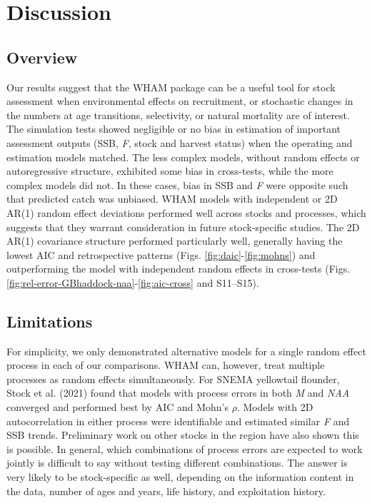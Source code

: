 \documentclass[]{article}
\begin{document}
\hypertarget{discussion}{%
\section{Discussion}\label{discussion}}

\hypertarget{overview}{%
\subsection{Overview}\label{overview}}

Our results suggest that the WHAM package can be a useful tool for stock
assessment when environmental effects on recruitment, or stochastic
changes in the numbers at age transitions, selectivity, or natural
mortality are of interest. The simulation tests showed negligible or no
bias in estimation of important assessment outputs (SSB, \emph{F}, stock
and harvest status) when the operating and estimation models matched.
The less complex models, without random effects or autoregressive
structure, exhibited some bias in cross-tests, while the more complex
models did not. In these cases, bias in SSB and \emph{F} were opposite
such that predicted catch was unbiased. WHAM models with independent or
2D AR(1) random effect deviations performed well across stocks and
processes, which suggests that they warrant consideration in future
stock-specific studies. The 2D AR(1) covariance structure performed
particularly well, generally having the lowest AIC and retrospective
patterns (Figs. \ref{fig:daic}-\ref{fig:mohns}) and outperforming the
model with independent random effects in cross-tests (Figs.
\ref{fig:rel-error-GBhaddock-naa}-\ref{fig:aic-cross} and S11--S15).

\hypertarget{limitations}{%
\subsection{Limitations}\label{limitations}}

For simplicity, we only demonstrated alternative models for a single
random effect process in each of our comparisons. WHAM can, however,
treat multiple processes as random effects simultaneously. For SNEMA
yellowtail flounder, Stock et al. (2021) found that models with process
errors in both \emph{M} and \emph{NAA} converged and performed best by
AIC and Mohn's \(\rho\). Models with 2D autocorrelation in either
process were identifiable and estimated similar \emph{F} and SSB trends.
Preliminary work on other stocks in the region have also shown this is
possible. In general, which combinations of process errors are expected
to work jointly is difficult to say without testing different
combinations. The answer is very likely to be stock-specific as well,
depending on the information content in the data, number of ages and
years, life history, and exploitation history.
\end{document}
